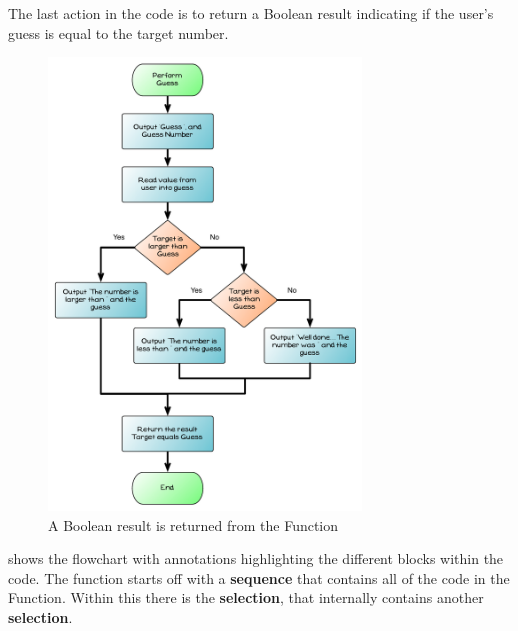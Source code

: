 \clearpage
The last action in the code is to return a Boolean result indicating if the user's guess is equal to the target number.

\begin{figure}[htbp]
   \centering
   \includegraphics[width=0.74\textwidth]{./topics/control-flow/diagrams/PerformGuess5} 
   \caption{A Boolean result is returned from the Function}
   \label{fig:perform-guess-5}
\end{figure}


\clearpage

 shows the flowchart with annotations highlighting the different blocks within the code. The function starts off with a \textbf{sequence} that contains all of the code in the Function. Within this there is the \textbf{selection}, that internally contains another \textbf{selection}.

